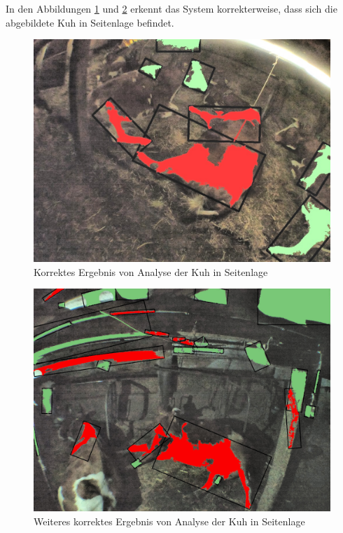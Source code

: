 In den Abbildungen \ref{fig: Korrektes Ergebnis von Analyse der Kuh in Seitenlage} und \ref{fig: Weiteres korrektes Ergebnis von Analyse der Kuh in Seitenlage} erkennt das System korrekterweise, dass sich die abgebildete Kuh in Seitenlage befindet. 

\begin{figure}[H]
	\center
	\includegraphics[scale=0.43]{Grafiken/resultate/resultatLying1.jpg}
	\caption{Korrektes Ergebnis von Analyse der Kuh in Seitenlage} 
	\label{fig: Korrektes Ergebnis von Analyse der Kuh in Seitenlage} 
\end{figure}


\begin{figure}[H]
	\center
	\includegraphics[scale=1.5]{Grafiken/resultate/resultatLying2.jpg}
	\caption{Weiteres korrektes Ergebnis von Analyse der Kuh in Seitenlage} 
	\label{fig: Weiteres korrektes Ergebnis von Analyse der Kuh in Seitenlage} 
\end{figure}

